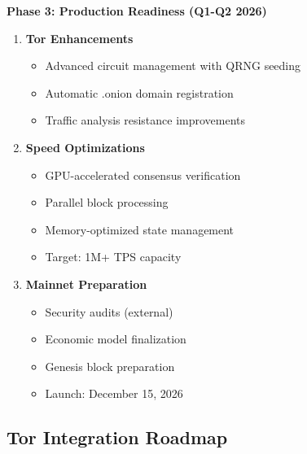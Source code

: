 \documentclass[12pt,a4paper]{article}
\begin{document}
\begin{futurebox}
\textbf{Phase 3: Production Readiness (Q1-Q2 2026)}

\begin{enumerate}
    \item \textbf{Tor Enhancements}
    \begin{itemize}
        \item Advanced circuit management with QRNG seeding
        \item Automatic .onion domain registration
        \item Traffic analysis resistance improvements
    \end{itemize}

    \item \textbf{Speed Optimizations}
    \begin{itemize}
        \item GPU-accelerated consensus verification
        \item Parallel block processing
        \item Memory-optimized state management
        \item Target: 1M+ TPS capacity
    \end{itemize}

    \item \textbf{Mainnet Preparation}
    \begin{itemize}
        \item Security audits (external)
        \item Economic model finalization
        \item Genesis block preparation
        \item Launch: December 15, 2026
    \end{itemize}
\end{enumerate}
\end{futurebox}

\subsection{Tor Integration Roadmap}
\end{document}
